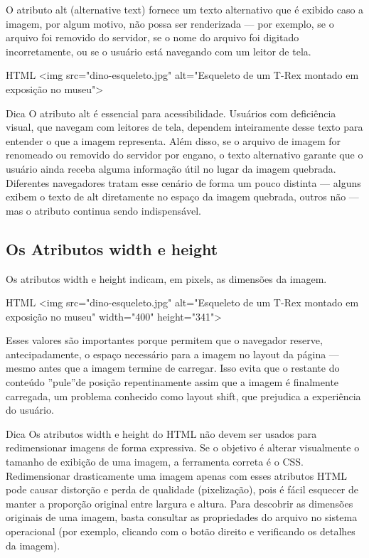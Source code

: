 O atributo alt (alternative text) fornece um texto alternativo que é exibido caso a imagem, por algum motivo, não possa ser renderizada — por exemplo, se o arquivo foi removido do servidor, se o nome do arquivo foi digitado incorretamente, ou se o usuário está navegando com um leitor de tela.

\begin{codebox}{HTML}
<img src="dino-esqueleto.jpg"
     alt="Esqueleto de um T-Rex montado em exposição no museu">
\end{codebox}

\begin{infobox}{Dica}
O atributo alt é essencial para acessibilidade. Usuários com deficiência visual, que navegam com leitores de tela, dependem inteiramente desse texto para entender o que a imagem representa. Além disso, se o arquivo de imagem for renomeado ou removido do servidor por engano, o texto alternativo garante que o usuário ainda receba alguma informação útil no lugar da imagem quebrada. Diferentes navegadores tratam esse cenário de forma um pouco distinta — alguns exibem o texto de alt diretamente no espaço da imagem quebrada, outros não — mas o atributo continua sendo indispensável.
\end{infobox}

\subsection{Os Atributos width e height}

Os atributos width e height indicam, em pixels, as dimensões da imagem.

\begin{codebox}{HTML}
<img src="dino-esqueleto.jpg"
     alt="Esqueleto de um T-Rex montado em exposição no museu"
     width="400"
     height="341">
\end{codebox}

Esses valores são importantes porque permitem que o navegador reserve, antecipadamente, o espaço necessário para a imagem no layout da página — mesmo antes que a imagem termine de carregar. Isso evita que o restante do conteúdo ”pule”de posição repentinamente assim que a imagem é finalmente carregada, um problema conhecido como layout shift, que prejudica a experiência do usuário.

\begin{infobox}{Dica}
Os atributos width e height do HTML não devem ser usados para redimensionar imagens de forma expressiva. Se o objetivo é alterar visualmente o tamanho de exibição de uma imagem, a ferramenta correta é o CSS. Redimensionar drasticamente uma imagem apenas com esses atributos HTML pode causar distorção e perda de qualidade (pixelização), pois é fácil esquecer de manter a proporção original entre largura e altura. Para descobrir as dimensões originais de uma imagem, basta consultar as propriedades do arquivo no sistema operacional (por exemplo, clicando com o botão direito e verificando os detalhes da imagem).
\end{infobox}

